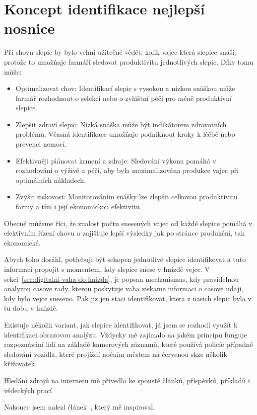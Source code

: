 \section{Koncept identifikace nejlepší nosnice}\label{sec:koncept-identifikace-nejlepsi-nosnice}

Při chovu slepic by bylo velmi užitečné vědět, kolik vajec která slepice snáší, protože to umožňuje farmáři sledovat produktivitu jednotlivých slepic.
Díky tomu může:
\begin{itemize}
    \item Optimalizovat chov: Identifikací slepic s vysokou a nízkou snáškou může farmář rozhodnout o selekci nebo o zvláštní péči pro méně produktivní slepice.
    \item Zlepšit zdraví slepic: Nízká snáška může být indikátorem zdravotních problémů.
    Včasná identifikace umožňuje podniknout kroky k léčbě nebo prevenci nemocí.
    \item Efektivněji plánovat krmení a zdroje: Sledování výkonu pomáhá v rozhodování o výživě a péči, aby byla maximalizována produkce vajec při optimálních nákladech.
    \item Zvýšit ziskovost: Monitorováním snášky lze zlepšit celkovou produktivitu farmy a tím i její ekonomickou efektivitu.
\end{itemize}

Obecně můžeme říci, že znalost počtu snesených vajec od každé slepice pomáhá v efektivním řízení chovu a zajišťuje lepší výsledky jak po stránce produkční, tak ekonomické.

Abych toho dosáhl, potřebuji být schopen jednotlivé slepice identifikovat a tuto informaci propojit s momentem, kdy slepice snese v hnízdě vejce.
V sekci~\ref{sec:digitalni-vaha-do-hnizda}, je popsan mechanismus, kdy pravidelnou analyzou casove rady, kterou poskytuje vaha ziskame informaci o casove udaji, kdy bylo vejce sneseno.
Pak jiz jen staci identifikovat, ktera z nasich slepic byla v tu dobu v hnízdě.

Existuje několik variant, jak slepice identifikovat, já jsem se rozhodl využít k identifikaci obrazovou analýzu.
Vždycky mě zajímalo na jakém principu funguje rozpoznávání lidí na základě kamerových záznamů, které používá policíe případně sledování vozidla, které projíždí nočním městem na červenou skze několik křižovatek.

Hledání zdrojů na internetu mě přivedlo ke spoustě článků, příspěvků, příkladů i vědeckých prací.

Nakonec jsem nalezl článek~\cite{medium-person-reidentification}, který mě inspiroval.

